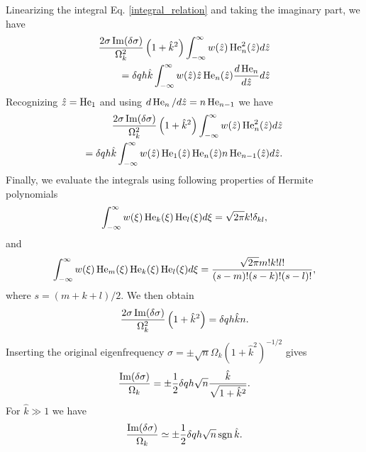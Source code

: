 Linearizing the integral Eq. \ref{integral_relation} and taking the
imaginary part, we have
\begin{align}
  \frac{2\sigma\operatorname{Im}(\delta\sigma)}{\Omega_k^2}
  \left(1+\hat{k}^2\right) \int_{-\infty}^{\infty} w(\hat{z})
  \operatorname{He}_n^2(\hat{z}) d\hat{z} \notag\\
  = \delta q h \hat{k} 
  \int_{-\infty}^{\infty}
  w(\hat{z})\hat{z}\operatorname{He}_n(\hat{z})\frac{d\operatorname{He}_n}{d\hat{z}} d\hat{z}
\end{align}
Recognizing $\hat{z} = \operatorname{He}_1$ and using $d\operatorname{He}_n/d\hat{z} = n
\operatorname{He}_{n-1}$ we have
 \begin{align}
   \frac{2\sigma\operatorname{Im}(\delta\sigma)}{\Omega_k^2}
   \left(1+\hat{k}^2\right) \int_{-\infty}^{\infty} w(\hat{z})
   \operatorname{He}_n^2(\hat{z}) d\hat{z} \notag\\
   =\delta q h \hat{k} 
   \int_{-\infty}^{\infty}
   w(\hat{z})\operatorname{He}_1(\hat{z})\operatorname{He}_n(\hat{z})n\operatorname{He}_{n-1}(\hat{z})d\hat{z}. 
 \end{align}
Finally, we evaluate the integrals using following properties of Hermite polynomials
\begin{align}
  \int_{-\infty}^{\infty}
  w(\xi) \operatorname{He}_k(\xi)\operatorname{He}_l(\xi) d\xi = \sqrt{2\pi}k!\delta_{kl}, 
\end{align}
and
\begin{align}
  \int_{-\infty}^{\infty}
  w(\xi) \operatorname{He}_m(\xi)\operatorname{He}_k(\xi)\operatorname{He}_l(\xi) d\xi =
  \frac{\sqrt{2\pi}m!k!l!}{(s-m)!(s-k)!(s-l)!}, 
\end{align}
where $s = (m+k+l)/2$. We then obtain
 \begin{align}
  \frac{2\sigma\operatorname{Im}(\delta\sigma)}{\Omega_k^2}
  \left(1+\hat{k}^2\right) = \delta q h \hat{k} n.
 \end{align}
Inserting the original eigenfrequency $\sigma = \pm
\sqrt{n}\Omega_k(1+\hat{k}^2)^{-1/2}$ gives
\begin{align}
  \frac{\operatorname{Im}(\delta\sigma)}{\Omega_k} = \pm \frac{1}{2}\delta q h
  \sqrt{n} \frac{\hat{k}}{\sqrt{1+\hat{k}^2}}. 
\end{align}
 For $\hat{k}\gg 1$ we have
\begin{align}
  \frac{\operatorname{Im}(\delta\sigma)}{\Omega_k} \simeq \pm \frac{1}{2}\delta q h
  \sqrt{n} \operatorname{sgn}{\hat{k}}. 
\end{align}